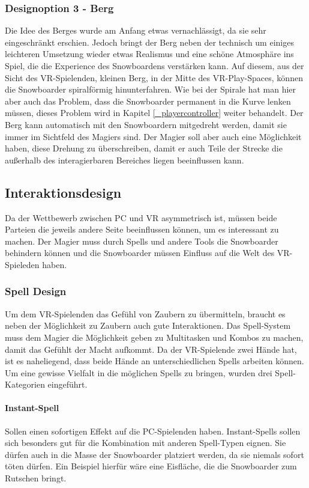 \subsubsection{Designoption 3 - Berg}
Die Idee des Berges wurde am Anfang etwas vernachlässigt, da sie sehr eingeschränkt erschien. Jedoch bringt der Berg neben der technisch um einiges leichteren Umsetzung wieder etwas Realismus und eine schöne Atmosphäre ins Spiel, die die Experience des Snowboardens verstärken kann. Auf diesem, aus der Sicht des VR-Spielenden, kleinen Berg, in der Mitte des VR-Play-Spaces, können die Snowboarder spiralförmig hinunterfahren. Wie bei der Spirale hat man hier aber auch das Problem, dass die Snowboarder permanent in die Kurve lenken müssen, dieses Problem wird in Kapitel \ref{_playercontroller} weiter behandelt. Der Berg kann automatisch mit den Snowboardern mitgedreht werden, damit sie immer im Sichtfeld des Magiers sind. Der Magier soll aber auch eine Möglichkeit haben, diese Drehung zu überschreiben, damit er auch Teile der Strecke die außerhalb des interagierbaren Bereiches liegen beeinflussen kann.

\subsection{Interaktionsdesign}
Da der Wettbewerb zwischen PC und VR asymmetrisch ist, müssen beide Parteien die jeweils andere Seite beeinflussen können, um es interessant zu machen. Der Magier muss durch Spells und andere Tools die Snowboarder behindern können und die Snowboarder müssen Einfluss auf die Welt des VR-Spieleden haben.

\subsubsection{Spell Design\label{_spell_design}}
Um dem VR-Spielenden das Gefühl von Zaubern zu übermitteln, braucht es neben der Möglichkeit zu Zaubern auch gute Interaktionen. Das Spell-System muss dem Magier die Möglichkeit geben zu Multitasken und Kombos zu machen, damit das Gefühlt der Macht aufkommt. Da der VR-Spielende zwei Hände hat, ist es naheliegend, dass beide Hände an unterschiedlichen Spells arbeiten können. Um eine gewisse Vielfalt in die möglichen Spells zu bringen, wurden drei Spell-Kategorien eingeführt.

\paragraph{Instant-Spell}
Sollen einen sofortigen Effekt auf die PC-Spielenden haben. Instant-Spells sollen sich besonders gut für die Kombination mit anderen Spell-Typen eignen. Sie dürfen auch in die Masse der Snowboarder platziert werden, da sie niemals sofort töten dürfen. Ein Beispiel hierfür wäre eine Eisfläche, die die Snowboarder zum Rutschen bringt.


